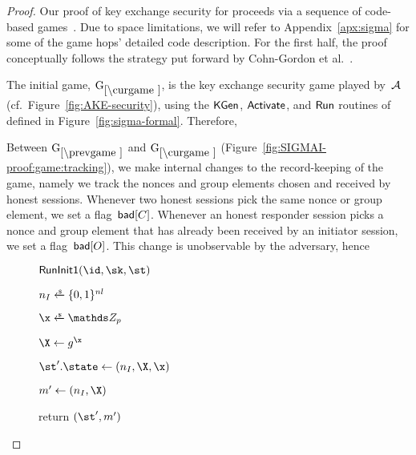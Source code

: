 \begin{proof}

Our proof of key exchange security for \SIGMAI proceeds via a sequence of code-based games~\cite{EC:BelRog06}.
\iffull\else
Due to space limitations, we will refer to Appendix~\ref{apx:sigma} for some of the game hops' detailed code description.
\fi
For the first half, the proof conceptually follows the strategy put forward by Cohn-Gordon et al.~\cite{C:CCGJJ19}.


\proofngame[initial]
The initial game, $\curGm$, is the key exchange security game played by~$\mathcal{A}$ (cf.\ Figure~\ref{fig:AKE-security}),
using the $\mathsf{KGen}$, $\mathsf{Activate}$, and $\mathsf{Run}$ routines of \SIGMAI defined in Figure~\ref{fig:sigma-formal}.
Therefore,

\proofngame[tracking]
Between $\prevGm$ and $\curGm$ (Figure~\ref{fig:SIGMAI-proof:game:tracking}\iffull{}\fi), we make internal changes to the record-keeping of the game, namely we track the nonces and group elements chosen and received by honest sessions.
Whenever two honest sessions pick the same nonce or group element, we set a flag~$\mathsf{bad}[C]$.
Whenever an honest responder session picks a nonce and group element that has already been received by an initiator session, we set a flag~$\mathsf{bad}[O]$. 
This change is unobservable by the adversary, hence


\begin{collectinmacro}{\SIGMIProofTrackingCollisions}{}{} %
\begin{figure}[tp]
	\begin{minipage}[t]{0.49\textwidth}

	\begin{oracle}{$\RunInitI(\id, \sk,\st)$}
		\item $\nonce_I \sample \bits^{\nl}$
		\item $\x \sample \ZZ_p$
		\item $\X \gets g^{\x}$
		\item {} 
		\item {}
		\item $\st'.\state \gets (\nonce_I,\X,\x)$
		\item $m' \gets (\nonce_I, \X)$
		\item return $(\st',m')$
	\end{oracle}


\end{minipage}
\end{figure}
\end{collectinmacro}
\end{proof}
